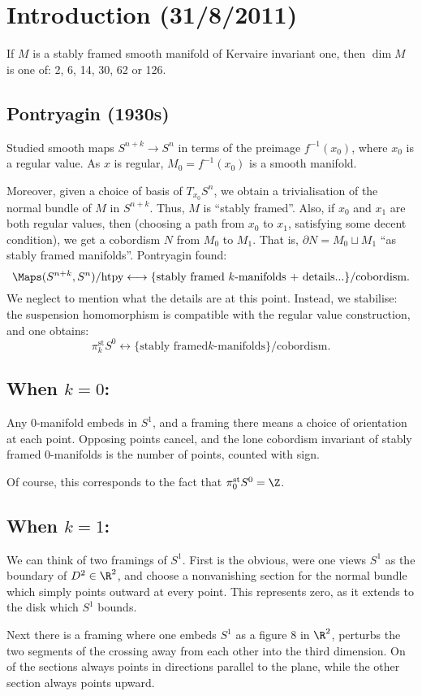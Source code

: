 \documentclass[11pt]{article}
\newcommand{\NewLecture}[3]{\section{Introduction {\small(#2/#3/2011)}}}
\begin{document}
\NewLecture{Introduction}{31}{8}
\begin{thm*}
If $M$ is a stably framed smooth manifold of Kervaire invariant one, then $\dim
M$ is one of: 2, 6, 14, 30, 62 or 126.
\end{thm*}
\subsection*{Pontryagin (1930s)}
Studied smooth maps $S^{n+k}\to S^n$ in terms
of the preimage $f^{-1}(x_0)$, where $x_0$ is a regular value. As $x$ is
regular, $M_0=f^{-1}(x_0)$ is a smooth manifold.

Moreover, given a choice of basis of $T_{x_0}S^n$, we obtain a trivialisation of
the normal bundle of $M$ in $S^{n+k}$. Thus, $M$ is ``stably framed''. Also, if
$x_0$ and $x_1$ are both regular values, then (choosing a path from $x_0$ to
$x_1$, satisfying some decent condition), we get a cobordism $N$ from $M_0$ to
$M_1$. That is, $\partial N=M_0\sqcup M_1$ ``as stably framed manifolds''.
Pontryagin found:
\[\Maps(S^{n+k},S^n)/\text{htpy}\longleftrightarrow\{\text{stably framed
$k$-manifolds + details...}\}/\text{cobordism}.\]
We neglect to mention what the details are at this point. Instead, we stabilise:
the suspension homomorphism is compatible with the regular value construction,
and one obtains:
\[\pi_k^\text{st}S^0\longleftrightarrow\{\text{stably framed
$k$-manifolds}\}/\text{cobordism}.\]
\subsection*{When \texorpdfstring{$k=0$}{k=0}:}
Any $0$-manifold embeds in $S^1$, and a framing there means a choice of
orientation at each point. Opposing points cancel, and the lone cobordism
invariant of stably framed $0$-manifolds is the number of points, counted with
sign.

Of course, this corresponds to the fact that $\pi_0^\text{st}S^0=\Z$.
\subsection*{When \texorpdfstring{$k=1$}{k=1}:}
We can think of two framings of $S^1$. First is the obvious, were one views
$S^1$ as the boundary of $D^2\in \R^2$, and choose a nonvanishing section for
the normal bundle which simply points outward at every point. This represents
zero, as it extends to the disk which $S^1$ bounds.

Next there is a framing where one embeds $S^1$ as a figure $8$ in $\R^2$,
perturbs the two segments of the crossing away from each other into the third
dimension. On of the sections always points in directions parallel to the plane,
while the other section always points upward.
\end{document}

